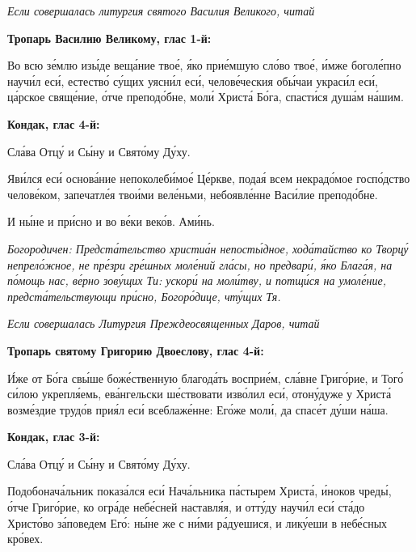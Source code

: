  \itshape Если совершалась литургия святого Василия Великого, читай\normalfont{}



 

\bfseries Тропарь Василию Великому, глас 1-й:\normalfont{}


   Во всю зе́млю изы́де веща́ние твое́, я́ко прие́мшую сло́во твое́, и́мже
боголе́пно научи́л еси́, естество́ су́щих уясни́л еси́, челове́ческия обы́чаи
украси́л еси́, ца́рское свяще́ние, о́тче преподо́бне, моли́ Христа́ Бо́га, спасти́ся
душа́м на́шим.



 

\bfseries Кондак, глас 4-й:\normalfont{}


   Сла́ва Отцу́ и Сы́ну и Свято́му Ду́ху.


   Яви́лся еси́ основа́ние непоколеби́мое́ Це́ркве, подая́ всем некрадо́мое
госпо́дство челове́ком, запечатле́я твои́ми веле́ньми, небоявле́нне Васи́лие
преподо́бне.


   И ны́не и при́сно и во ве́ки веко́в. Ами́нь.


 \itshape Богородичен:\normalfont{} Предста́тельство христиа́н непосты́дное, хода́тайство ко
Творцу́ непрело́жное, не пре́зри гре́шных моле́ний гла́сы, но предвари́, я́ко
Блага́я, на по́мощь нас, ве́рно зову́щих Ти: ускори́ на моли́тву, и
потщи́ся на умоле́ние, предста́тельствующи при́сно, Богоро́дице, чту́щих
Тя.


 \itshape Если совершалась Литургия Преждеосвященных Даров, читай\normalfont{}



 

\bfseries Тропарь святому Григорию Двоеслову, глас 4-й:\normalfont{}


   И́же от Бо́га свы́ше боже́ственную благода́ть восприе́м, сла́вне Григо́рие,
и Того́ си́лою укрепля́емь, ева́нгельски ше́ствовати изво́лил еси́, отону́дуже у
Христа́ возме́здие трудо́в прия́л еси́ всеблаже́нне: Его́же моли́, да спасе́т
ду́ши на́ша.



 

\bfseries Кондак, глас 3-й:\normalfont{}


   Сла́ва Отцу́ и Сы́ну и Свято́му Ду́ху.


   Подобонача́льник показа́лся еси́ Нача́льника па́стырем Христа́, и́ноков
чреды́, о́тче Григо́рие, ко огра́де небе́сней наставля́я, и отту́ду научи́л еси́
ста́до Христо́во за́поведем Его́: ны́не же с ни́ми ра́дуешися, и лику́еши в
небе́сных кро́вех.



